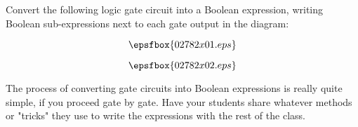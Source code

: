 

Convert the following logic gate circuit into a Boolean expression, writing Boolean sub-expressions next to each gate output in the diagram:

$$\epsfbox{02782x01.eps}$$







$$\epsfbox{02782x02.eps}$$







The process of converting gate circuits into Boolean expressions is really quite simple, if you proceed gate by gate.  Have your students share whatever methods or "tricks" they use to write the expressions with the rest of the class.




